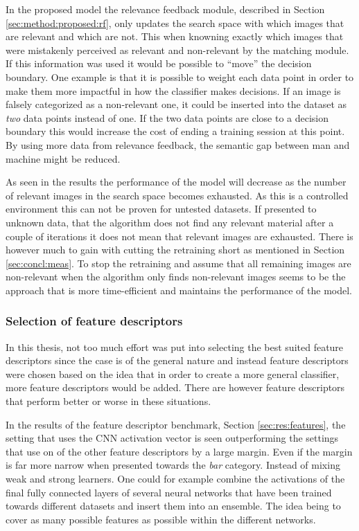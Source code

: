 In the proposed model the relevance feedback module, described in Section \ref{sec:method:proposed:rf}, only updates the search space with which images that are relevant and which are not. This when knowning exactly which images that were mistakenly perceived as relevant and non-relevant by the matching module. If this information was used it would be possible to ``move'' the decision boundary. 
One example is that it is possible to weight each data point in order to make them more impactful in how the classifier makes decisions. If an image is falsely categorized as a non-relevant one, it could be inserted into the dataset as \emph{two} data points instead of one. If the two data points are close to a decision boundary this would increase the cost of ending a training session at this point. By using more data from relevance feedback, the semantic gap between man and machine might be reduced. 

As seen in the results the performance of the model will decrease as the number of relevant images in the search space becomes exhausted. As this is a controlled environment this can not be proven for untested datasets. If presented to unknown data, that the algorithm does not find any relevant material after a couple of iterations it does not mean that relevant images are exhausted. There is however much to gain with cutting the retraining short as mentioned in Section \ref{sec:concl:meas}. To stop the retraining and assume that all remaining images are non-relevant when the algorithm only finds non-relevant images seems to be the approach that is more time-efficient and maintains the performance of the model.

\subsubsection{Selection of feature descriptors}
\label{sec:conc:future:model:feat}
In this thesis, not too much effort was put into selecting the best suited feature descriptors since the case is of the general nature and instead feature descriptors were chosen based on the idea that in order to create a more general classifier, more feature descriptors would be added. There are however feature descriptors that perform better or worse in these situations.

In the results of the feature descriptor benchmark, Section \ref{sec:res:features}, the setting that uses the CNN activation vector is seen outperforming the settings that use on of the other feature descriptors by a large margin. Even if the margin is far more narrow when presented towards the \emph{bar} category. Instead of mixing weak and strong learners. One could for example combine the activations of the final fully connected layers of several neural networks that have been trained towards different datasets and insert them into an ensemble. The idea being to cover as many possible features as possible within the different networks. 

